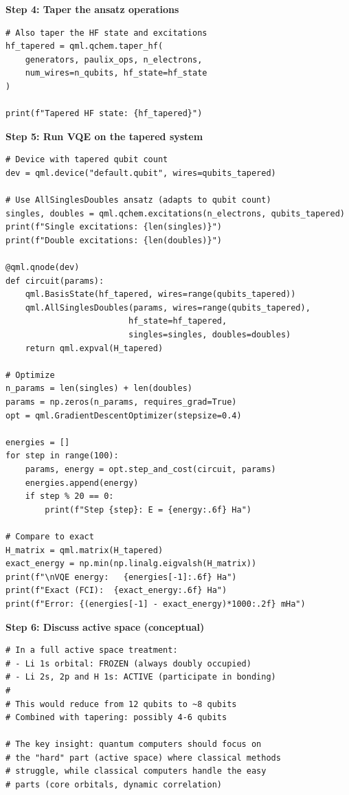 \documentclass[11pt,a4paper]{article}
\begin{document}
\textbf{Step 4: Taper the ansatz operations}
\begin{lstlisting}
# Also taper the HF state and excitations
hf_tapered = qml.qchem.taper_hf(
    generators, paulix_ops, n_electrons, 
    num_wires=n_qubits, hf_state=hf_state
)

print(f"Tapered HF state: {hf_tapered}")
\end{lstlisting}

\textbf{Step 5: Run VQE on the tapered system}
\begin{lstlisting}
# Device with tapered qubit count
dev = qml.device("default.qubit", wires=qubits_tapered)

# Use AllSinglesDoubles ansatz (adapts to qubit count)
singles, doubles = qml.qchem.excitations(n_electrons, qubits_tapered)
print(f"Single excitations: {len(singles)}")
print(f"Double excitations: {len(doubles)}")

@qml.qnode(dev)
def circuit(params):
    qml.BasisState(hf_tapered, wires=range(qubits_tapered))
    qml.AllSinglesDoubles(params, wires=range(qubits_tapered),
                         hf_state=hf_tapered,
                         singles=singles, doubles=doubles)
    return qml.expval(H_tapered)

# Optimize
n_params = len(singles) + len(doubles)
params = np.zeros(n_params, requires_grad=True)
opt = qml.GradientDescentOptimizer(stepsize=0.4)

energies = []
for step in range(100):
    params, energy = opt.step_and_cost(circuit, params)
    energies.append(energy)
    if step % 20 == 0:
        print(f"Step {step}: E = {energy:.6f} Ha")

# Compare to exact
H_matrix = qml.matrix(H_tapered)
exact_energy = np.min(np.linalg.eigvalsh(H_matrix))
print(f"\nVQE energy:   {energies[-1]:.6f} Ha")
print(f"Exact (FCI):  {exact_energy:.6f} Ha")
print(f"Error: {(energies[-1] - exact_energy)*1000:.2f} mHa")
\end{lstlisting}

\textbf{Step 6: Discuss active space (conceptual)}
\begin{lstlisting}
# In a full active space treatment:
# - Li 1s orbital: FROZEN (always doubly occupied)
# - Li 2s, 2p and H 1s: ACTIVE (participate in bonding)
# 
# This would reduce from 12 qubits to ~8 qubits
# Combined with tapering: possibly 4-6 qubits

# The key insight: quantum computers should focus on
# the "hard" part (active space) where classical methods
# struggle, while classical computers handle the easy
# parts (core orbitals, dynamic correlation)
\end{lstlisting}
\end{document}
